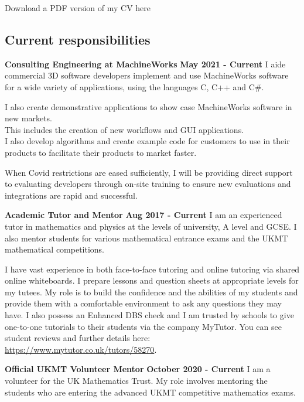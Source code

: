 \documentclass[a4paper,12pt]{article}
\begin{document}
\maketitle

{
\setcounter{tocdepth}{3}
\tableofcontents
}
Download a PDF version of my CV here

\hypertarget{current-responsibilities}{%
\subsection{Current responsibilities}\label{current-responsibilities}}

\textbf{Consulting Engineering at MachineWorks} {\textbf{May 2021 -
Current}} I aide commercial 3D software developers implement and use
MachineWorks software for a wide variety of applications, using the
languages C, C++ and C\#.

I also create demonstrative applications to show case MachineWorks
software in new markets.\\
This includes the creation of new workflows and GUI applications.\\
I also develop algorithms and create example code for customers to use
in their products to facilitate their products to market faster.

When Covid restrictions are eased sufficiently, I will be providing
direct support to evaluating developers through on-site training to
ensure new evaluations and integrations are rapid and successful.

\textbf{Academic Tutor and Mentor} {\textbf{Aug 2017 - Current} } I am
an experienced tutor in mathematics and physics at the levels of
university, A level and GCSE. I also mentor students for various
mathematical entrance exams and the UKMT mathematical competitions.

I have vast experience in both face-to-face tutoring and online tutoring
via shared online whiteboards. I prepare lessons and question sheets at
appropriate levels for my tutees. My role is to build the confidence and
the abilities of my students and provide them with a comfortable
environment to ask any questions they may have. I also possess an
Enhanced DBS check and I am trusted by schools to give one-to-one
tutorials to their students via the company MyTutor. You can see student
reviews and further details here:
\url{https://www.mytutor.co.uk/tutors/58270}.

\textbf{ Official UKMT Volunteer Mentor}{ \textbf{October 2020 -
Current} } I am a volunteer for the UK Mathematics Trust. My role
involves mentoring the students who are entering the advanced UKMT
competitive mathematics exams.
\end{document}
